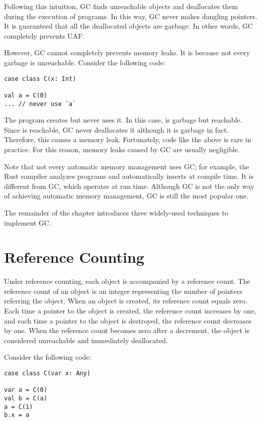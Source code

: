Following this intuition, GC finds unreachable objects and deallocates them
during the execution of programs. In this way, GC never makes dangling pointers.
It is guaranteed that all the deallocated objects are garbage. In other words,
GC completely prevents UAF.

However, GC cannot completely prevents memory leaks. It is because not every
garbage is unreachable. Consider the following code:

\begin{verbatim}
case class C(x: Int)

val a = C(0)
... // never use `a`
\end{verbatim}

The program creates  but never uses it. In this case,  is
garbage but reachable. Since  is reachable, GC never deallocates it
although it is garbage in fact. Therefore, this causes a memory leak.
Fortunately, code like the above is rare in practice. For this reason, memory
leaks caused by GC are usually negligible.

Note that not every automatic memory management uses GC; for example, the Rust
compiler analyzes programs and automatically inserts  at compile
time. It is different from GC, which operates at run time. Although GC is not
the only way of achieving automatic memory management, GC is still the most
popular one.

The remainder of the chapter introduces three widely-used techniques to
implement GC.

\section{Reference Counting}

Under reference counting, each object is accompanied by a reference count. The
reference count of an object is an integer representing the number of pointers
referring the object. When an object is created, its reference count equals
zero. Each time a pointer to the object is created, the reference count
increases by one, and each time a pointer to the object is destroyed, the
reference count decreases by one. When the reference count becomes zero after a
decrement, the object is considered unreachable and immediately deallocated.

Consider the following code:

\begin{verbatim}
case class C(var x: Any)

var a = C(0)
val b = C(a)
a = C(1)
b.x = a
\end{verbatim}

